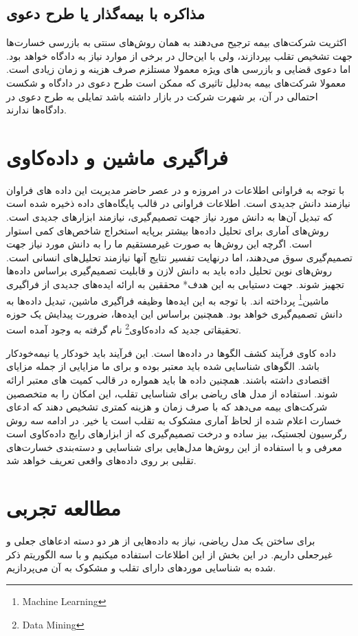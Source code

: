 \documentclass[paper=a4, fontsize=11pt]{article}
\numberwithin{equation}{section} %
\numberwithin{figure}{section} %
\numberwithin{table}{section} %
\begin{document}
\subsection{مذاکره با بیمه‌گذار یا طرح دعوی}
اکثریت شرکت‌های بیمه ترجیح می‌دهند به همان روش‌های سنتی به بازرسی خسارت‌ها جهت تشخیص تقلب بپردازند، ولی با این‌حال در برخی از موارد نیاز به دادگاه خواهد بود. اما دعوی قضایی و بازرسی های ویژه معمولا مستلزم صرف هزینه و زمان زیادی است. معمولا شرکت‌های بیمه به‌دلیل تاثیری که ممکن است طرح دعوی در دادگاه و شکست احتمالی در آن، بر شهرت شرکت در بازار داشته باشد تمایلی به طرح دعوی در دادگاه‌ها ندارند.

\section{فراگیری ماشین و داده‌کاوی}
\par
با توجه به فراوانی اطلاعات در امروزه و در عصر حاضر مدیریت این داده های فراوان نیازمند دانش جدیدی است.
اطلاعات فراوانی در قالب پایگاه‌های داده ذخیره شده است که تبدیل آن‌ها به دانش مورد نیاز جهت تصمیم‌گیری، نیازمند ابزار‌های جدیدی است. روش‌های آماری برای تحلیل داده‌ها بیشتر برپایه استخراج شاخص‌های کمی استوار است. اگرچه این روش‌ها به صورت غیرمستقیم ما را به دانش مورد نیاز جهت تصمیم‌گیری سوق می‌دهند، اما درنهایت تفسیر نتایج آنها نیازمند تحلیل‌های انسانی است. روش‌های نوین تحلیل داده باید به دانش لازن و قابلیت تصمیم‌گیری براساس داده‌ها تجهیز شوند. جهت دستیابی به این هدف* محققین به ارائه ایده‌های جدیدی از فراگیری ماشین\footnote{Machine Learning} پرداخته اند.
با توجه به این ایده‌ها وظیفه فراگیری ماشین، تبدیل داده‌ها به دانش تصمیم‌گیری خواهد بود. همچنین براساس این ایده‌ها، ضرورت پیدایش یک حوزه تحقیقاتی جدید که داده‌کاوی\footnote{Data Mining} نام گرفته به وجود آمده است.
\par
داده کاوی فرآیند کشف الگو‌ها در داده‌ها است. این فرآیند باید خودکار یا نیمه‌خودکار باشد. الگو‌های شناسایی شده باید معتبر بوده و برای ما مزایایی از جمله مزایای اقتصادی داشته باشند. همچنین داده ها باید همواره در قالب کمیت های معتبر ارائه شوند.
استفاده از مدل های ریاضی برای شناسایی تقلب، این امکان را به متخصصین شرکت‌های بیمه می‌دهد که با صرف زمان و هزینه کمتری تشخیص دهند که ادعای خسارت اعلام شده از لحاظ آماری مشکوک به تقلب است یا خیر. در ادامه سه روش رگرسیون لجستیک، بیز ساده و درخت تصمیم‌گیری که از ابزار‌های رایج داده‌کاوی است معرفی و با استفاده از این روش‌ها مدل‌هایی برای شناسایی و دسته‌بندی خسارت‌های تقلبی بر روی داده‌های واقعی تعریف خواهد شد.

\newpage
\section{مطالعه تجربی}
\par
برای ساختن یک مدل ریاضی، نیاز به داده‌هایی از هر دو دسته ادعاهای جعلی و غیرجعلی داریم. در این بخش از این اطلاعات استفاده میکنیم و با سه الگوریتم ذکر شده به شناسایی موردهای دارای تقلب و مشکوک به آن می‌پردازیم.
\end{document}
